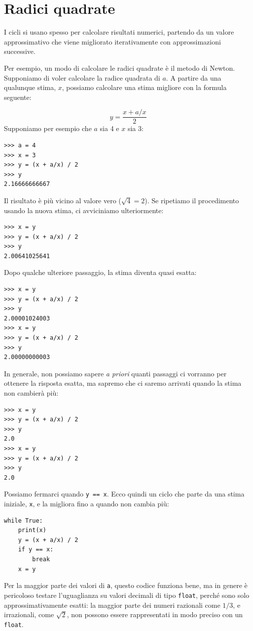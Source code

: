 \documentclass[10pt]{book}
\begin{document}
\section{Radici quadrate}
\label{squareroot}

I cicli si usano spesso per calcolare risultati numerici, partendo da un valore approssimativo che viene migliorato iterativamente con approssimazioni successive.

Per esempio, un modo di calcolare le radici quadrate è il metodo di Newton. Supponiamo di voler calcolare la radice quadrata di $a$. A partire da una qualunque stima, $x$, possiamo calcolare una stima migliore con la formula seguente:

\[ y = \frac{x + a/x}{2} \]
%
Supponiamo per esempio che $a$ sia 4 e $x$ sia 3:

\begin{verbatim}
>>> a = 4
>>> x = 3
>>> y = (x + a/x) / 2
>>> y
2.16666666667
\end{verbatim}
%
Il risultato è più vicino al valore vero ($\sqrt{4} = 2$).  Se ripetiamo il procedimento usando la nuova stima, ci avviciniamo ulteriormente:

\begin{verbatim}
>>> x = y
>>> y = (x + a/x) / 2
>>> y
2.00641025641
\end{verbatim}
%
Dopo qualche ulteriore passaggio, la stima diventa quasi esatta:

\begin{verbatim}
>>> x = y
>>> y = (x + a/x) / 2
>>> y
2.00001024003
>>> x = y
>>> y = (x + a/x) / 2
>>> y
2.00000000003
\end{verbatim}
%
In generale, non possiamo sapere {\em a priori} quanti passaggi ci vorranno per ottenere la risposta esatta, ma sapremo che ci saremo arrivati quando la stima non cambierà più:

\begin{verbatim}
>>> x = y
>>> y = (x + a/x) / 2
>>> y
2.0
>>> x = y
>>> y = (x + a/x) / 2
>>> y
2.0
\end{verbatim}
%
Possiamo fermarci quando {\tt y == x}.  Ecco quindi un ciclo che parte da una stima iniziale, {\tt x}, e la migliora fino a quando non cambia più:

\begin{verbatim}
while True:
    print(x)
    y = (x + a/x) / 2
    if y == x:
        break
    x = y
\end{verbatim}
%
Per la maggior parte dei valori di {\tt a}, questo codice funziona bene, ma in genere è pericoloso testare l'uguaglianza su valori decimali di tipo {\tt float},
perché sono solo approssimativamente esatti: la maggior parte dei numeri razionali come $1/3$, e irrazionali, come $\sqrt{2}$, non possono essere rappresentati in modo preciso con un {\tt float}.
\end{document}
